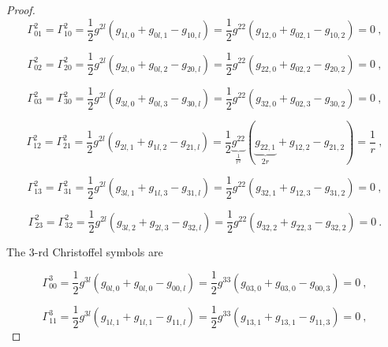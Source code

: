 \begin{proof}
        \begin{equation*}
            \Gamma^2_{01} = \Gamma^2_{10} = \frac{1}{2} g^{2l} (g_{1l,0} + g_{0l,1} - g_{10,l}) =  \frac{1}{2} g^{22} (g_{12,0} + g_{02,1} - g_{10,2}) = 0 ~, 
        \end{equation*}

        \begin{equation*}
            \Gamma^2_{02} = \Gamma^2_{20} = \frac{1}{2} g^{2l} (g_{2l,0} + g_{0l,2} - g_{20,l}) =  \frac{1}{2} g^{22} (g_{22,0} + g_{02,2} - g_{20,2}) = 0 ~,
        \end{equation*}

        \begin{equation*}
            \Gamma^2_{03} = \Gamma^2_{30} = \frac{1}{2} g^{2l} (g_{3l,0} + g_{0l,3} - g_{30,l}) =  \frac{1}{2} g^{22} (g_{32,0} + g_{02,3} - g_{30,2}) = 0 ~,
        \end{equation*}

        \begin{equation*}
            \Gamma^2_{12} = \Gamma^2_{21} = \frac{1}{2} g^{2l} (g_{2l,1} + g_{1l,2} - g_{21,l}) =  \frac{1}{2} \underbrace{g^{22}}_{\frac{1}{r^2}} (\underbrace{g_{22,1}}_{2r} + g_{12,2} - g_{21,2}) = \frac{1}{r} ~,
        \end{equation*}

        \begin{equation*}
            \Gamma^2_{13} = \Gamma^2_{31} = \frac{1}{2} g^{2l} (g_{3l,1} + g_{1l,3} - g_{31,l}) =  \frac{1}{2} g^{22} (g_{32,1} + g_{12,3} - g_{31,2}) = 0 ~, 
        \end{equation*}

        \begin{equation*}
            \Gamma^2_{23} = \Gamma^2_{32} = \frac{1}{2} g^{2l} (g_{3l,2} + g_{2l,3} - g_{32,l}) =  \frac{1}{2} g^{22} (g_{32,2} + g_{22,3} - g_{32,2}) = 0 ~. 
        \end{equation*}

        The $3$-rd Christoffel symbols are

        \begin{equation*}
            \Gamma^3_{00} = \frac{1}{2} g^{3l} (g_{0l,0} + g_{0l,0} - g_{00,l}) = \frac{1}{2} g^{33} (g_{03,0} + g_{03,0} - g_{00,3}) = 0 ~,
        \end{equation*}

        \begin{equation*}
            \Gamma^3_{11} = \frac{1}{2} g^{3l} (g_{1l,1} + g_{1l,1} - g_{11,l}) = \frac{1}{2} g^{33} (g_{13,1} + g_{13,1} - g_{11,3}) = 0 ~,
        \end{equation*}


\end{proof}
